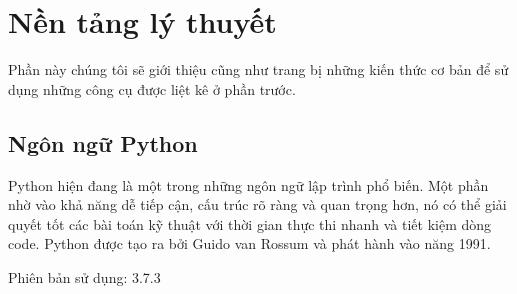 \chapter{Nền tảng lý thuyết}
Phần này chúng tôi sẽ giới thiệu cũng như trang bị những kiến thức cơ bản để sử dụng những công cụ được liệt kê ở phần trước.
\section{Ngôn ngữ Python}
Python hiện đang là một trong những ngôn ngữ lập trình phổ biến. Một phần nhờ vào khả năng dễ tiếp cận, cấu trúc rõ ràng và quan trọng hơn, nó có thể giải quyết tốt các bài toán kỹ thuật với thời gian thực thi nhanh và tiết kiệm dòng code. Python được tạo ra bởi Guido van Rossum và phát hành vào năng 1991.\cite{python}
\par
Phiên bản sử dụng: 3.7.3
